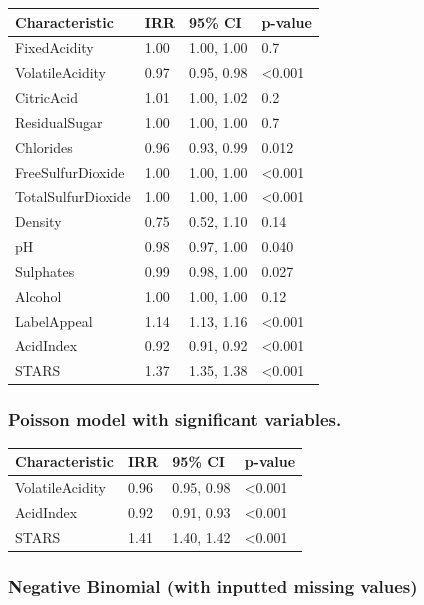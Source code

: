 \documentclass[]{elsarticle} %
\begin{document}
\begin{longtable}[]{@{}llll@{}}
\toprule
\textbf{Characteristic} & \textbf{IRR} & \textbf{95\% CI} &
\textbf{p-value}\tabularnewline
\midrule
\endhead
FixedAcidity & 1.00 & 1.00, 1.00 & 0.7\tabularnewline
VolatileAcidity & 0.97 & 0.95, 0.98 & \textless0.001\tabularnewline
CitricAcid & 1.01 & 1.00, 1.02 & 0.2\tabularnewline
ResidualSugar & 1.00 & 1.00, 1.00 & 0.7\tabularnewline
Chlorides & 0.96 & 0.93, 0.99 & 0.012\tabularnewline
FreeSulfurDioxide & 1.00 & 1.00, 1.00 & \textless0.001\tabularnewline
TotalSulfurDioxide & 1.00 & 1.00, 1.00 & \textless0.001\tabularnewline
Density & 0.75 & 0.52, 1.10 & 0.14\tabularnewline
pH & 0.98 & 0.97, 1.00 & 0.040\tabularnewline
Sulphates & 0.99 & 0.98, 1.00 & 0.027\tabularnewline
Alcohol & 1.00 & 1.00, 1.00 & 0.12\tabularnewline
LabelAppeal & 1.14 & 1.13, 1.16 & \textless0.001\tabularnewline
AcidIndex & 0.92 & 0.91, 0.92 & \textless0.001\tabularnewline
STARS & 1.37 & 1.35, 1.38 & \textless0.001\tabularnewline
\bottomrule
\end{longtable}

\hypertarget{poisson-model-with-significant-variables.}{%
\subsubsection{Poisson model with significant
variables.}\label{poisson-model-with-significant-variables.}}

\begin{longtable}[]{@{}llll@{}}
\toprule
\textbf{Characteristic} & \textbf{IRR} & \textbf{95\% CI} &
\textbf{p-value}\tabularnewline
\midrule
\endhead
VolatileAcidity & 0.96 & 0.95, 0.98 & \textless0.001\tabularnewline
AcidIndex & 0.92 & 0.91, 0.93 & \textless0.001\tabularnewline
STARS & 1.41 & 1.40, 1.42 & \textless0.001\tabularnewline
\bottomrule
\end{longtable}

\hypertarget{negative-binomial-with-inputted-missing-values}{%
\subsubsection{Negative Binomial (with inputted missing
values)}\label{negative-binomial-with-inputted-missing-values}}
\end{document}
